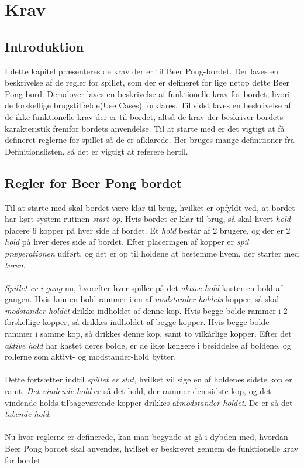 \documentclass[Rapport/Rapport_main.tex]{subfiles}
\begin{document}
\section{Krav}
\subsection{Introduktion}
I dette kapitel præsenteres de krav der er til Beer Pong-bordet. Der laves en beskrivelse af de regler for spillet, som der er defineret for lige netop dette Beer Pong-bord. Derudover laves en beskrivelse af funktionelle krav for bordet, hvori de forskellige brugstilfælde(Use Cases) forklares. Til sidst laves en beskrivelse af de ikke-funktionelle krav der er til bordet, altså de krav der beskriver bordets karakteristik fremfor bordets anvendelse. Til at starte med er det vigtigt at få defineret reglerne for spillet så de er afklarede. Her bruges mange definitioner fra Definitionslisten, så det er vigtigt at referere hertil.
\subsection{Regler for Beer Pong bordet}
Til at starte med skal bordet være klar til brug, hvilket er opfyldt ved, at bordet har kørt system rutinen \textit{start op}. Hvis bordet er klar til brug, så skal hvert \textit{hold} placere 6 kopper på hver side af bordet. Et \textit{hold} består af 2 brugere, og der er 2 \textit{hold} på hver deres side af bordet. Efter placeringen af kopper er \textit{spil præperationen} udført, og det er op til holdene at bestemme hvem, der starter med \textit{turen}.\\\\
\textit{Spillet er i gang} nu, hvorefter hver spiller på det \textit{aktive hold} kaster en bold af gangen. Hvis kun en bold rammer i en af \textit{modstander holdets} kopper, så skal \textit{modstander holdet} drikke indholdet af denne kop. Hvis begge bolde rammer i 2 forskellige kopper, så drikkes indholdet af begge kopper. Hvis begge bolde rammer i samme kop, så drikkes denne kop, samt to vilkårlige kopper. Efter det \textit{aktive hold} har kastet deres bolde, er de ikke længere i besiddelse af boldene, og rollerne som aktivt- og modstander-hold bytter.\\\\
Dette fortsætter indtil \textit{spillet er slut}, hvilket vil sige en af holdenes sidste kop er ramt. \textit{Det vindende hold} er så det hold, der rammer den sidste kop, og det vindende holds tilbageværende kopper drikkes af\textit{modstander holdet}. De er så det \textit{tabende hold}.\\\\
Nu hvor reglerne er definerede, kan man begynde at gå i dybden med, hvordan Beer Pong bordet skal anvendes, hvilket er beskrevet gennem de funktionelle krav for bordet.
\end{document}
